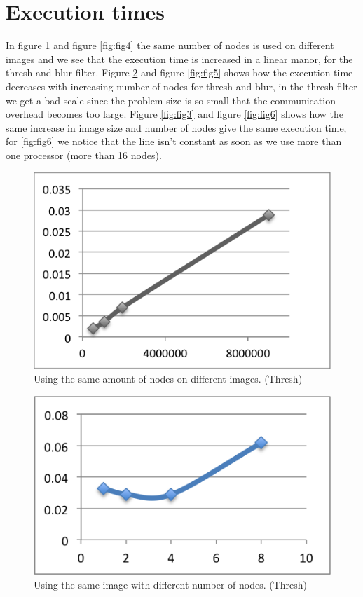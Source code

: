 \documentclass[a4paper]{article}
\begin{document}
\section{Execution times}
In figure \ref{fig:fig1} and figure \ref{fig:fig4} the same number of nodes is used on different images and we see that the execution time is increased in a linear manor, for the thresh and blur filter. Figure \ref{fig:fig2} and figure \ref{fig:fig5} shows how the execution time decreases with increasing number of nodes for thresh and blur, in the thresh filter we get a bad scale since the problem size is so small that the communication overhead becomes too large. Figure \ref{fig:fig3} and figure \ref{fig:fig6} shows how the same increase in image size and number of nodes give the same execution time, for \ref{fig:fig6} we notice that the line isn\rq{}t constant as soon as we use more than one processor (more than 16 nodes).

\begin{figure}[h]
  \centering
  \includegraphics{sameProcessors.png}
  \caption{Using the same amount of nodes on different images. (Thresh)}
  \label{fig:fig1}
\end{figure}

\begin{figure}[h]
  \centering
  \includegraphics{samePixels.png}
  \caption{Using the same image with different number of nodes. (Thresh)}
  \label{fig:fig2}
\end{figure}
\end{document}
